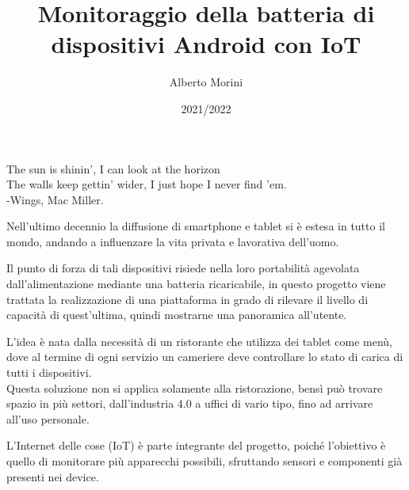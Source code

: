 \documentclass[target=bach]{thud}
\title{Monitoraggio della batteria di dispositivi Android con IoT}
\author{Alberto Morini}
\date{2021/2022}
\begin{document}
\maketitle

\begin{dedication}
	The sun is shinin', I can look at the horizon\\
	The walls keep gettin' wider, I just hope I never find 'em.\\
	-Wings, Mac Miller.
\end{dedication}


\abstract

    Nell'ultimo decennio la diffusione di smartphone e tablet si è estesa in tutto il mondo, andando a influenzare la vita privata e lavorativa dell'uomo.\

    Il punto di forza di tali dispositivi risiede nella loro portabilità agevolata dall'alimentazione mediante una batteria ricaricabile, in questo progetto viene trattata la realizzazione di una piattaforma in grado di rilevare il livello di capacità di quest'ultima, quindi mostrarne una panoramica all'utente.

    L'idea è nata dalla necessità di un ristorante che utilizza dei tablet come menù, dove al termine di ogni servizio un cameriere deve controllare lo stato di carica di tutti i dispositivi.\\
    Questa soluzione non si applica solamente alla ristorazione, bensì può trovare spazio in più settori, dall'industria 4.0 a uffici di vario tipo, fino ad arrivare all'uso personale.

    L'Internet delle cose (IoT) è parte integrante del progetto, poiché l'obiettivo è quello di monitorare più apparecchi possibili, sfruttando sensori e componenti già presenti nei device.


\tableofcontents


\listoffigures

\mainmatter



\end{document}
